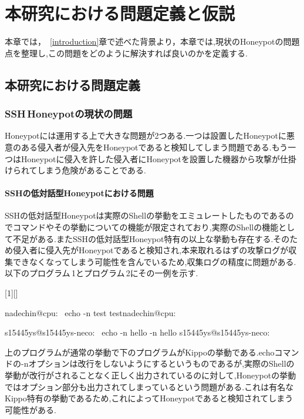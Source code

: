 \chapter{本研究における問題定義と仮説}
\label{approach}

本章では，~\ref{introduction}章で述べた背景より，本章では,現状のHoneypotの問題点を整理し,この問題をどのように解決すれば良いのかを定義する.

\section{本研究における問題定義}
\label{approach:problem}

\subsection{SSH\,Honeypotの現状の問題}
\label{approach:problemofSshHoneypot}
Honeypotには運用する上で大きな問題が2つある.一つは設置したHoneypotに悪意のある侵入者が侵入先をHoneypotであると検知してしまう問題である.もう一つはHoneypotに侵入を許した侵入者にHoneypotを設置した機器から攻撃が仕掛けられてしまう危険があることである.

\subsubsection{SSHの低対話型Honeypotにおける問題}
\label{approach:problemofSshLowHoneypot}
SSHの低対話型Honeypotは実際のShellの挙動をエミュレートしたものであるのでコマンドやその挙動についての機能が限定されており,実際のShellの機能として不足がある.またSSHの低対話型Honeypot特有の以上な挙動も存在する.そのため侵入者に侵入先がHoneypotであると検知され,本来取れるはずの攻撃ログが収集できなくなってしまう可能性を含んでいるため,収集ログの精度に問題がある.
以下のプログラム\,1とプログラム\,2にその一例を示す.

\vspace{5mm}
[1][]
    {\lstset{
        frame=single,
        basicstyle=\ttfamily,
        numbers=left,
        numbersep=10pt,
        tabsize=2,
        extendedchars=true,
        xleftmargin=17pt,
        framexleftmargin=17pt,
        #1
    }
}{}

\begin{mylisting}[language=sh,caption=正しいShellの挙動]
nadechin@cpu:~ echo -n test
testnadechin@cpu:~
\end{mylisting}

\begin{mylisting}[language=sh,caption=Kippo特有の異常な挙動の例]
s15445ys@s15445ys-neco:~ echo -n hello
-n hello
s15445ys@s15445ys-neco:~
\end{mylisting}
上のプログラムが通常の挙動で下のプログラムがKippoの挙動である.echoコマンドの-nオプションは改行をしないようにするというものであるが,実際のShellの挙動が改行がされることなく正しく出力されているのに対して,Honeypotの挙動ではオプション部分も出力されてしまっているという問題がある.これは有名なKippo特有の挙動であるため,これによってHoneypotであると検知されてしまう可能性がある.

